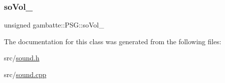 \mbox{\label{classgambatte_1_1PSG_aeb17ad71a433bdbd37bd25f005f94541}} 
\subsubsection{\texorpdfstring{so\+Vol\+\_\+}{soVol\_}}
{\footnotesize\ttfamily unsigned gambatte\+::\+P\+S\+G\+::so\+Vol\+\_\+\hspace{0.3cm}{\ttfamily [private]}}



The documentation for this class was generated from the following files\+:\begin{DoxyCompactItemize}
\item 
src/\hyperlink{sound_8h}{sound.\+h}\item 
src/\hyperlink{sound_8cpp}{sound.\+cpp}\end{DoxyCompactItemize}
